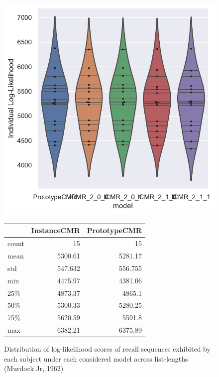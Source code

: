 \documentclass[
  letterpaper,
  DIV=11,
  numbers=noendperiod]{scrreport}
\begin{document}
\begin{figure}

\begin{minipage}[c]{\linewidth}

{\centering 

\includegraphics{./figures/individual_murdock1962.pdf}

}

\end{minipage}%
\newline
\begin{minipage}[c]{\linewidth}

{\centering 

\begin{longtable}[]{@{}lrr@{}}
\toprule()
& InstanceCMR & PrototypeCMR \\
\midrule()
\endhead
count & 15 & 15 \\
mean & 5300.61 & 5281.17 \\
std & 547.632 & 556.755 \\
min & 4475.97 & 4381.06 \\
25\% & 4873.37 & 4865.1 \\
50\% & 5300.33 & 5280.25 \\
75\% & 5620.59 & 5591.8 \\
max & 6382.21 & 6375.89 \\
\bottomrule()
\end{longtable}

}

\end{minipage}%

\caption{\label{fig-Murd62Fits}Distribution of log-likelihood scores of
recall sequences exhibited by each subject under each considered model
across list-lengths (Murdock Jr, 1962)}

\end{figure}
\end{document}
